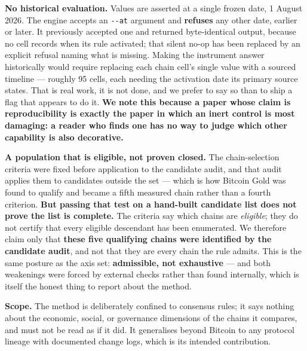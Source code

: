\documentclass[
]{article}
\begin{document}
\textbf{No historical evaluation.} Values are asserted at a single
frozen date, 1 August 2026. The engine accepts an \texttt{-\/-at}
argument and \textbf{refuses} any other date, earlier or later. It
previously accepted one and returned byte-identical output, because no
cell records when its rule activated; that silent no-op has been
replaced by an explicit refusal naming what is missing. Making the
instrument answer historically would require replacing each chain cell's
single value with a sourced timeline --- roughly 95 cells, each needing
the activation date its primary source states. That is real work, it is
not done, and we prefer to say so than to ship a flag that appears to do
it. \textbf{We note this because a paper whose claim is reproducibility
is exactly the paper in which an inert control is most damaging: a
reader who finds one has no way to judge which other capability is also
decorative.}

\textbf{A population that is eligible, not proven closed.} The
chain-selection criteria were fixed before application to the candidate
audit, and that audit applies them to candidates outside the set ---
which is how Bitcoin Gold was found to qualify and became a fifth
measured chain rather than a fourth criterion. \textbf{But passing that
test on a hand-built candidate list does not prove the list is
complete.} The criteria say which chains are \emph{eligible}; they do
not certify that every eligible descendant has been enumerated. We
therefore claim only that \textbf{these five qualifying chains were
identified by the candidate audit}, and not that they are every chain
the rule admits. This is the same posture as the axis set:
\textbf{admissible, not exhaustive} --- and both weakenings were forced
by external checks rather than found internally, which is itself the
honest thing to report about the method.

\textbf{Scope.} The method is deliberately confined to consensus rules;
it says nothing about the economic, social, or governance dimensions of
the chains it compares, and must not be read as if it did. It
generalises beyond Bitcoin to any protocol lineage with documented
change logs, which is its intended contribution.
\end{document}
